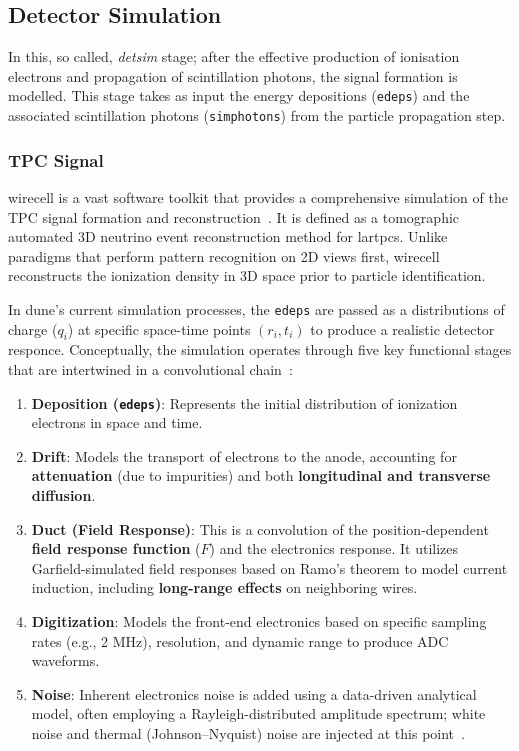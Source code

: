 \subsection{Detector Simulation}
In this, so called, \emph{detsim} stage; after the effective production of ionisation electrons and propagation of scintillation photons, the signal formation is modelled. This stage takes as input the energy depositions (\texttt{edeps}) and the associated scintillation photons (\texttt{simphotons}) from the particle propagation step.  

\subsubsection{TPC Signal} 
\gls{wirecell} is a vast software toolkit that provides a comprehensive simulation of the TPC signal formation and reconstruction~\cite{wirecell}. It is defined as a tomographic automated 3D neutrino event reconstruction method for \glspl{lartpc}. Unlike paradigms that perform pattern recognition on 2D views first, \gls{wirecell} reconstructs the ionization density in 3D space prior to particle identification.

In \gls{dune}'s current simulation processes, the \texttt{edeps} are passed as a distributions of charge ($q_i$) at specific space-time points $(r_i, t_i)$ to produce a realistic detector responce. Conceptually, the simulation operates through five key functional stages that are intertwined in a convolutional chain~\cite{Adams_2018_I,Adams_2018_II}: 

\begin{enumerate}
    \item \textbf{Deposition (\texttt{edeps})}: Represents the initial distribution of ionization electrons in space and time.
    \item \textbf{Drift}: Models the transport of electrons to the anode, accounting for \textbf{attenuation} (due to impurities) and both \textbf{longitudinal and transverse diffusion}.
    \item \textbf{Duct (Field Response)}: This is a convolution of the position-dependent \textbf{field response function} ($F$) and the electronics response. It utilizes Garfield-simulated field responses based on Ramo's theorem to model current induction, including \textbf{long-range effects} on neighboring wires.
    \item \textbf{Digitization}: Models the front-end electronics based on specific sampling rates (e.g., 2 MHz), resolution, and dynamic range to produce ADC waveforms.
    \item \textbf{Noise}: Inherent electronics noise is added using a data-driven analytical model, often employing a Rayleigh-distributed amplitude spectrum; white noise and thermal (Johnson--Nyquist) noise are injected at this point~\cite{DUNE:2026hdelectronics}.
\end{enumerate}

